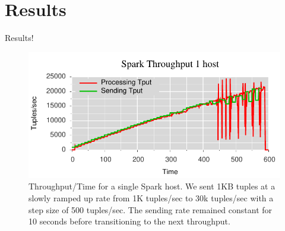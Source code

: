 \section{Results}
Results!

\begin{figure}[t]
\centering
\includegraphics[width=1\linewidth]{figures/sp1_tput.pdf}
\caption{Throughput/Time for a single Spark host. We sent 1KB tuples at a slowly ramped up rate from 1K tuples/sec to 30k tuples/sec with a step size of 500 tuples/sec. The sending rate remained constant for 10 seconds before transitioning to the next throughput.}
\label{fig:label-me-if-you-want}
\end{figure}


